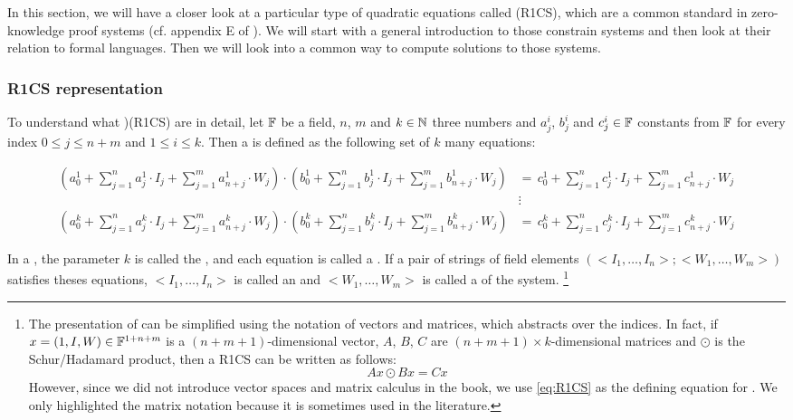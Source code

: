 In this section, we will have a closer look at a particular type of quadratic equations called  (R1CS), which are a common standard in zero-knowledge proof systems (cf. appendix E of \cite{sasson-2013}). We will start with a general introduction to those constrain systems and then look at their relation to formal languages. Then we will look into a common way to compute solutions to those systems. 

\subsubsection{R1CS representation} To understand what  )(R1CS) are in detail, let $\mathbb{F}$ be a field, $n$, $m$ and $k\in\mathbb{N}$ three numbers and $a_j^i$, $b_j^i$ and $c_j^i\in\mathbb{F}$ constants from $\mathbb{F}$ for every index $0\leq j \leq n+m$ and $1\leq i \leq k$. Then a  is defined as the following set of $k$ many equations: 

\begin{definition}\label{R1CS}
\begin{equation}\label{eq:R1CS}
\begin{split}
\scriptstyle\left(a^1_0 + \sum_{j=1}^n a^1_j \cdot I_j + \sum_{j=1}^m a^1_{n+j} \cdot W_j  \right) \cdot 
\left(b^1_0 + \sum_{j=1}^n b^1_j \cdot I_j + \sum_{j=1}^m b^1_{n+j} \cdot W_j  \right) &=\, 
\scriptstyle c^1_0 + \sum_{j=1}^n c^1_j \cdot I_j + \sum_{j=1}^m c^1_{n+j} \cdot W_j\\
       & \vdots\\
\scriptstyle\left(a^k_0 + \sum_{j=1}^n a^k_j \cdot I_j + \sum_{j=1}^m a^k_{n+j} \cdot W_j  \right) \cdot 
\left(b^k_0 + \sum_{j=1}^n b^k_j \cdot I_j + \sum_{j=1}^m b^k_{n+j} \cdot W_j  \right) &=\, 
\scriptstyle c^k_0 + \sum_{j=1}^n c^k_j \cdot I_j + \sum_{j=1}^m c^k_{n+j} \cdot W_j       
\end{split}
\end{equation}
\end{definition}

In a , the parameter $k$ is called the , and each equation is called a . If a pair of strings of field elements $(<I_1,\ldots, I_n>; <W_1,\ldots,W_m>)$  satisfies theses equations, $<I_1,\ldots, I_n>$ is called an  and $<W_1,\ldots,W_m>$ is called a  of the system.%
\footnote{The presentation of  can be simplified using the notation of vectors and matrices, which abstracts over the indices. In fact, if $x= (1,I,W)\in \mathbb{F}^{1+n+m}$ is a $(n+m+1)$-dimensional vector, $A$, $B$, $C$ are $(n+m+1)\times k$-dimensional matrices and $\odot$ is the Schur/Hadamard product, then a R1CS can be written as follows:
$$
Ax \odot Bx = Cx
$$
However,  since we did not introduce vector spaces and matrix calculus in the book, we use \ref{eq:R1CS} as the defining equation for . We only highlighted the matrix notation because it is sometimes used in the literature.}

